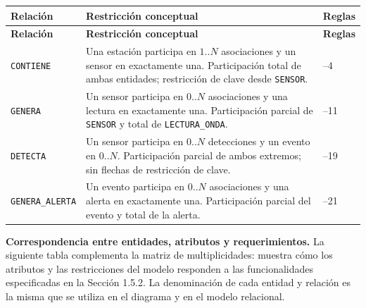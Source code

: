 \documentclass[12pt,a4paper]{article}
\begin{document}
\begin{longtable}{>{\raggedright\arraybackslash}p{3.0cm} >{\raggedright\arraybackslash}p{8.5cm} >{\raggedright\arraybackslash}p{2.8cm}}
\toprule
\textbf{Relación} & \textbf{Restricción conceptual} & \textbf{Reglas} \\
\midrule
\endfirsthead
\toprule
\textbf{Relación} & \textbf{Restricción conceptual} & \textbf{Reglas} \\
\midrule
\endhead
\texttt{CONTIENE} & Una estación participa en \(1..N\) asociaciones y un sensor en exactamente una. Participación total de ambas entidades; restricción de clave desde \texttt{SENSOR}. & 2--4 \\
\texttt{GENERA} & Un sensor participa en \(0..N\) asociaciones y una lectura en exactamente una. Participación parcial de \texttt{SENSOR} y total de \texttt{LECTURA\_\allowbreak{}ONDA}. & 9--11 \\
\texttt{DETECTA} & Un sensor participa en \(0..N\) detecciones y un evento en \(0..N\). Participación parcial de ambos extremos; sin flechas de restricción de clave. & 15--19 \\
\texttt{GENERA\_\allowbreak{}ALERTA} & Un evento participa en \(0..N\) asociaciones y una alerta en exactamente una. Participación parcial del evento y total de la alerta. & 20--21 \\
\bottomrule
\end{longtable}

\noindent
\textbf{Correspondencia entre entidades, atributos y requerimientos.} La siguiente tabla
complementa la matriz de multiplicidades: muestra cómo los atributos y las
restricciones del modelo responden a las funcionalidades especificadas en la
Sección 1.5.2. La denominación de cada entidad y relación es la misma que se
utiliza en el diagrama y en el modelo relacional.
\end{document}
